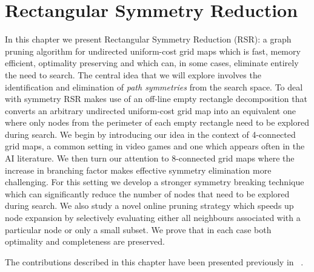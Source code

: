 \chapter{Rectangular Symmetry Reduction}
\label{cha:rsr}
In this chapter we present Rectangular Symmetry Reduction (RSR): a graph pruning
algorithm for undirected uniform-cost grid maps which is fast, memory efficient,
optimality preserving and which can, in some cases, eliminate entirely the need
to search.  The central idea that we will explore involves the identification
and elimination of \emph{path symmetries} from the search space. 
To deal with symmetry RSR makes use of an off-line
empty rectangle decomposition that converts an arbitrary
undirected uniform-cost grid map into an equivalent one where only nodes
from the perimeter of each empty rectangle need to be explored during search.
We begin by introducing our idea in the context of 4-connected grid maps, a common
setting in video games and one which appears often in the AI literature.
We then turn our attention to 8-connected grid maps where the increase in
branching factor makes effective symmetry elimination more challenging. 
For this setting we develop a stronger symmetry breaking technique which can significantly
reduce the number of nodes that need to be explored during search. We also study a novel 
online pruning strategy which speeds up node expansion by selectively evaluating either 
all neighbours associated with a particular node or only a small subset.  
We prove that in each case both optimality and completeness are preserved.

The contributions described in this chapter have been presented previously in
~\cite{harabor10, harabor11a, harabor11c}.

